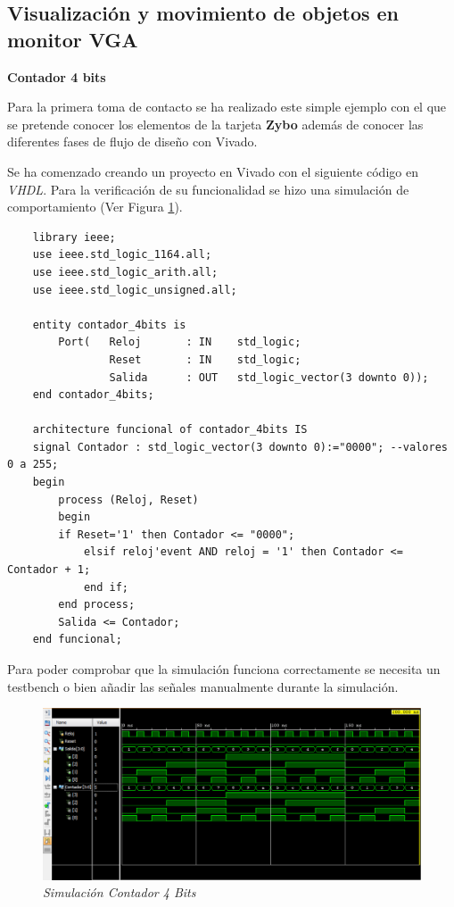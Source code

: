 \subsection{Visualización y movimiento de objetos en monitor VGA}

\textbf{Contador 4 bits}

Para la primera toma de contacto se ha realizado este simple ejemplo con el que se pretende conocer los elementos 
de la tarjeta \textbf{Zybo} además de conocer las diferentes fases de flujo de diseño con Vivado.

Se ha comenzado creando un proyecto en Vivado con el siguiente código en \textit{VHDL}. Para la verificación de su 
funcionalidad se hizo una simulación de comportamiento (Ver Figura \ref{contador}).

\begin{lstlisting}
    library ieee;
    use ieee.std_logic_1164.all;
    use ieee.std_logic_arith.all;
    use ieee.std_logic_unsigned.all;

    entity contador_4bits is
        Port(	Reloj		: IN	std_logic;
                Reset		: IN 	std_logic;
                Salida		: OUT	std_logic_vector(3 downto 0));
    end contador_4bits;

    architecture funcional of contador_4bits IS
    signal Contador : std_logic_vector(3 downto 0):="0000"; --valores 0 a 255;
    begin
        process (Reloj, Reset)
        begin
        if Reset='1' then Contador <= "0000";
            elsif reloj'event AND reloj = '1' then Contador <= Contador + 1;			
            end if;
        end process;
        Salida <= Contador;
    end funcional;
\end{lstlisting}

Para poder comprobar que la simulación funciona correctamente se necesita un testbench o bien 
añadir las señales manualmente durante la simulación.

\begin{figure}[H]
    \centering
    \includegraphics[width = 1\textwidth]{imagenes/contador4bits.png}
    \caption{\textit{Simulación Contador 4 Bits}}\label{contador}
\end{figure}

